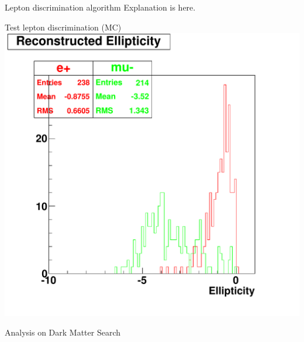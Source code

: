 \documentclass[14pt]{beamer}
\begin{document}
\begin{frame}{Lepton discrimination algorithm}
	Explanation is here.
\end{frame}

\begin{frame}{Test lepton discrimination (MC)}
	\centering
	\includegraphics[width=0.8\linewidth]{emu_mtq_recon_ellipticity-3Mcut.pdf}
\end{frame}

\begin{frame}
	Analysis on Dark Matter Search
\end{frame}
\end{document}
